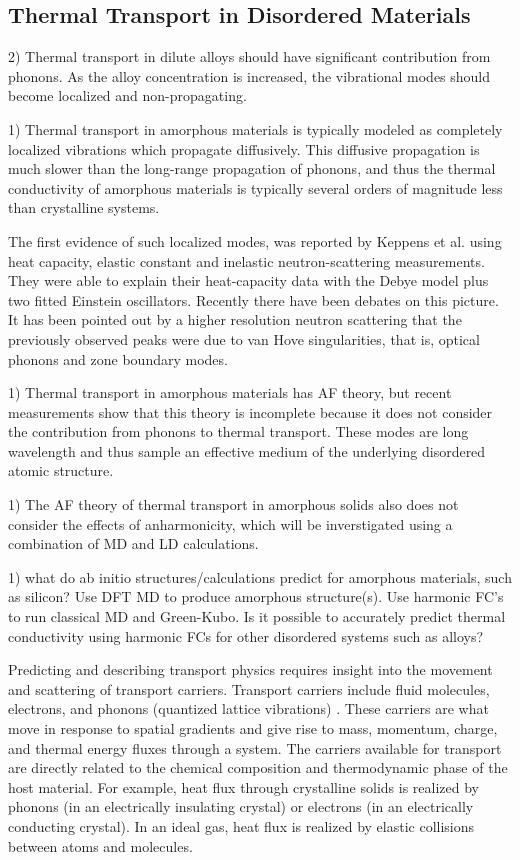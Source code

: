 \documentclass[letterpaper,12pt]{article}
\begin{document}
\subsection{\label{S-Intro}Thermal Transport in Disordered Materials}


2) Thermal transport in dilute alloys should have significant contribution from phonons.  As the alloy concentration is increased, the vibrational modes should become localized and non-propagating.

1) Thermal transport in amorphous materials is typically modeled as completely localized vibrations which propagate diffusively.\cite{allen1993}  This diffusive propagation is much slower than the long-range propagation of phonons, and thus the thermal conductivity of amorphous materials is typically several orders of magnitude less than crystalline systems.\cite{freeman1986,cahill1992}

The first evidence of such localized modes, was reported by Keppens et al.\cite{keppens1998} using heat
capacity, elastic constant and inelastic neutron-scattering
measurements. They were able to explain their heat-capacity data with the Debye model plus two fitted Einstein oscillators. Recently there have been debates on this picture. It has
been pointed out by a higher resolution neutron scattering
that the previously observed peaks were due to van Hove
singularities, that is, optical phonons and zone boundary
modes.

1) Thermal transport in amorphous materials has AF theory, but recent measurements show that this theory
is incomplete because it does not consider the contribution from phonons to thermal transport.\cite{he2011} These modes are long wavelength and thus sample an effective medium of the underlying disordered atomic structure.

1) The AF theory of thermal transport in amorphous solids also does not consider the effects of anharmonicity, which will be inverstigated using a combination of MD and LD calculations.\cite{cahill1987}

1) what do ab initio structures/calculations predict for amorphous materials, such as silicon? Use DFT MD to produce amorphous structure(s). Use harmonic FC's to run classical MD and Green-Kubo.  Is it possible to accurately predict thermal conductivity using harmonic FCs for other disordered systems such as alloys?

Predicting and describing transport physics requires insight into
the movement and scattering of transport carriers. Transport
carriers include fluid molecules, electrons, and phonons (quantized
lattice vibrations) \cite{kaviany2008}. These carriers are what move
in response to spatial gradients and give rise to mass, momentum,
charge, and thermal energy fluxes through a system. The carriers
available for transport are directly related to the chemical
composition and thermodynamic phase of the host material. For
example, heat flux through crystalline solids is realized by phonons
(in an electrically insulating crystal) or electrons (in an
electrically conducting crystal). In an ideal gas, heat flux is
realized by elastic collisions between atoms and molecules.
\end{document}

